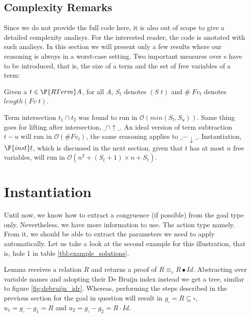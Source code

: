 \subsection{Complexity Remarks}

Since we do not provide the full code here, it is also out of 
scope to give a detailed complexity analisys. For the interested reader, the 
code is anotated with such analisys. In this section we will present only a 
few results where our reasoning is always in a worst-case setting.
Two important measures over s have to be introduced, that is,
the size of a term and the set of free variables of a term:

\newcommand{\bigO}[1]{\mathcal{O}(#1)}
\begin{minipage}[t]{0.45\textwidth}
\end{minipage}
\begin{minipage}[t]{0.45\textwidth}
\end{minipage}

Given a $t \in \F{RTerm} A$, for all $A$, $S_t$ denotes $(S\; t)$ and 
$\#\;Fv_t$ denotes $length (Fv\;t)$. 

Term intersection $t_1 \cap t_2$ was found to run in $\bigO{min(S_t, S_u)}$.
Same thing goes for lifting after intersection, $\_\cap\uparrow\_$. 
An ideal version of term subtraction $t - u$ will run in $\bigO{\# Fv_t}$,
the same reasoning applies to $\_-\downarrow\_$.
Instantiation, $\F{inst }t$, which is discussed in the next section, given
that $t$ has at most $n$ free variables, will run in 
$\bigO{n^2 + (S_t + 1)\times n + S_t}$.


\section{Instantiation}

Until now, we know how to extract a congruence (if possible) from the goal type only. Nevertheless,
we have more information to use. The action type namely. From it, we should be able to extract
the parameters we need to apply automatically. Let us take a look at the second example
for this illustration, that is, hole 1 in table \ref{tbl:example_solutions}.

Lemma  receives a relation $R$ and returns a proof of $R \equiv_r R ∙ Id$. Abstracting
over variable names and adopting their De Bruijn index instead we get a tree, similar to figure \ref{fig:debruijn_idr}. Whereas, performing the steps described in the previous section
for the goal in question will result in $g_\square = R \subseteq \square$, $u_1 = g_\square - g_1 = R$
and $u_2 = g_\square - g_2 = R \cdot Id$.

